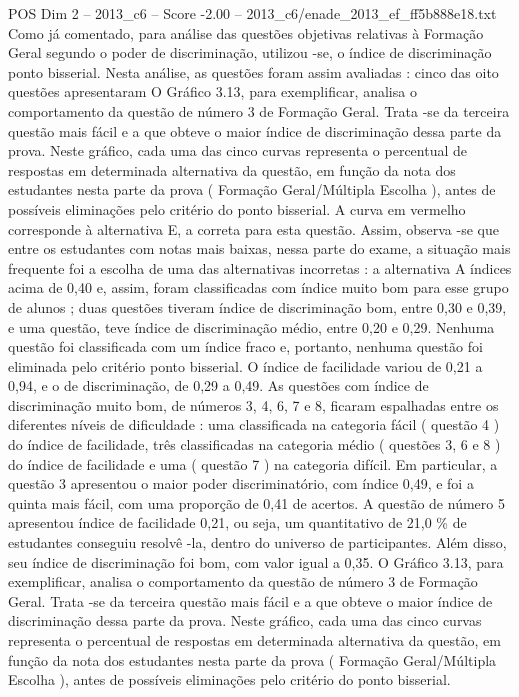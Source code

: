 \begin{textsample}{POS Dim 2 – 2013\_c6 – Score -2.00 – 2013\_c6/enade\_2013\_ef\_ff5b888e18.txt}
Como já comentado, para análise das questões objetivas relativas à Formação Geral segundo o poder de discriminação, utilizou -se, o índice de discriminação ponto bisserial.
Nesta análise, as questões foram assim avaliadas : cinco das oito questões apresentaram O Gráfico 3.13, para exemplificar, analisa o comportamento da questão de número 3 de Formação Geral.
Trata -se da terceira questão mais fácil e a que obteve o maior índice de discriminação dessa parte da prova.
Neste gráfico, cada uma das cinco curvas representa o percentual de respostas em determinada alternativa da questão, em função da nota dos estudantes nesta parte da prova ( Formação Geral/Múltipla Escolha ), antes de possíveis eliminações pelo critério do ponto bisserial.
A curva em vermelho corresponde à alternativa E, a correta para esta questão.
Assim, observa -se que entre os estudantes com notas mais baixas, nessa parte do exame, a situação mais frequente foi a escolha de uma das alternativas incorretas : a alternativa A índices acima de 0,40 e, assim, foram classificadas com índice muito bom para esse grupo de alunos ; duas questões tiveram índice de discriminação bom, entre 0,30 e 0,39, e uma questão, teve índice de discriminação médio, entre 0,20 e 0,29.
Nenhuma questão foi classificada com um índice fraco e, portanto, nenhuma questão foi eliminada pelo critério ponto bisserial.
O índice de facilidade variou de 0,21 a 0,94, e o de discriminação, de 0,29 a 0,49.
As questões com índice de discriminação muito bom, de números 3, 4, 6, 7 e 8, ficaram espalhadas entre os diferentes níveis de dificuldade : uma classificada na categoria fácil ( questão 4 ) do índice de facilidade, três classificadas na categoria médio ( questões 3, 6 e 8 ) do índice de facilidade e uma ( questão 7 ) na categoria difícil.
Em particular, a questão 3 apresentou o maior poder discriminatório, com índice 0,49, e foi a quinta mais fácil, com uma proporção de 0,41 de acertos.
A questão de número 5 apresentou índice de facilidade 0,21, ou seja, um quantitativo de 21,0 \% de estudantes conseguiu resolvê -la, dentro do universo de participantes.
Além disso, seu índice de discriminação foi bom, com valor igual a 0,35.
O Gráfico 3.13, para exemplificar, analisa o comportamento da questão de número 3 de Formação Geral.
Trata -se da terceira questão mais fácil e a que obteve o maior índice de discriminação dessa parte da prova.
Neste gráfico, cada uma das cinco curvas representa o percentual de respostas em determinada alternativa da questão, em função da nota dos estudantes nesta parte da prova ( Formação Geral/Múltipla Escolha ), antes de possíveis eliminações pelo critério do ponto bisserial.

\end{textsample}

